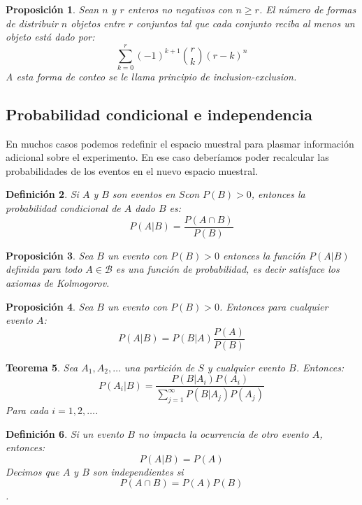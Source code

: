 \documentclass[14pt]{extarticle}
\newtheorem{theorem}{Teorema}[section]
\newtheorem{proposition}[theorem]{Proposición}
\newtheorem{definition}[theorem]{Definición}
\begin{document}
\begin{proposition}
    Sean $n$ y $r$ enteros no negativos con $n \geq r$. El número de formas de distribuir $n$ objetos entre $r$ conjuntos
    tal que cada conjunto reciba al menos un objeto está dado por:
    \[
        \sum_{k=0}^r (-1)^{k+1}\binom{r}{k}(r-k)^n
    \]
    A esta forma de conteo se le llama principio de inclusion-exclusion.
\end{proposition}

\subsection{Probabilidad condicional e independencia}
En muchos casos podemos redefinir el espacio muestral para plasmar información adicional sobre el experimento. En ese caso deberíamos poder
recalcular las probabilidades de los eventos en el nuevo espacio muestral.

\begin{definition}
    Si $A$ y $B$ son eventos en $S$con $P(B) > 0$, entonces la probabilidad condicional de $A$ dado $B$ es:
    \[
        P(A|B) = \frac{P(A \cap B)}{P(B)}
    \]
\end{definition}

\begin{proposition}
    Sea $B$ un evento con $P(B) > 0$ entonces la función $P(A|B)$ definida para todo $A \in \mathcal{B}$ es una función de probabilidad,
    es decir satisface los axiomas de Kolmogorov.
\end{proposition}

\begin{proposition}
    Sea $B$ un evento con $P(B) > 0$. Entonces para cualquier evento $A$:
    \[
        P(A|B) = P(B|A) \frac{P(A)}{P(B)}
    \]
\end{proposition}


\begin{theorem}
    Sea $A_1, A_2, \ldots$ una partición de $S$ y cualquier evento $B$. Entonces:
    \[
        P(A_i|B) = \frac{P(B|A_i)P(A_i)}{\sum_{j=1}^\infty P(B|A_j)P(A_j)}
    \]
    Para cada $i = 1, 2, \ldots$.
\end{theorem}

\begin{definition}
    Si un evento $B$ no impacta la ocurrencia de otro evento $A$, entonces:
    \[
        P(A|B) = P(A)
    \]
    Decimos que $A$ y $B$ son independientes si $$P(A \cap B) = P(A)P(B)$$.
\end{definition}
\end{document}
